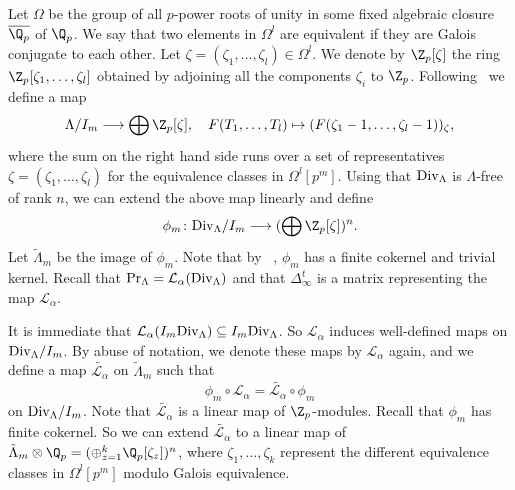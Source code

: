 Let $\Omega$ be the group of all $p$-power roots of unity in some fixed algebraic closure $\overline{\Q_p}$ of $\Q_p$. We say that two elements in $\Omega^l$ are equivalent if they are Galois conjugate to each other.  Let $\zeta=(\zeta_1,\dots,\zeta_l)\in \Omega^l$. We denote by $\Z_p[\zeta]$ the ring $\Z_p[\zeta_1,\dots,\zeta_l]$ obtained by adjoining all the components $\zeta_i$ to $\Z_p$. Following~\cite{cuoco-monsky} we define a map
\[\Lambda/I_m\longrightarrow \bigoplus \Z_p[\zeta], \quad F(T_1,\dots,T_l)\mapsto (F(\zeta_1-1,\dots, \zeta_l-1))_\zeta, \]
where the sum on the right hand side runs over a set of representatives ${\zeta = (\zeta_1, \ldots, \zeta_l)}$ for the equivalence classes in $\Omega^l[p^m]$. 
Using that $\textup{Div}_\Lambda$ is $\Lambda$-free of rank $n$, we can extend the above map linearly and define 
\[\phi_m\colon \textup{Div}_\Lambda/I_m\longrightarrow (\bigoplus \Z_p[\zeta])^n. \] 
Let $\tilde{\Lambda}_m$ be the image of $\phi_m$. Note that by ~\cite[Theorem~2.2]{cuoco-monsky}, $\phi_m$ has a finite cokernel and trivial kernel. Recall that $\textup{Pr}_\Lambda=\mathcal{L}_\alpha(\textup{Div}_\Lambda)$ and that $\Delta^t_\infty$ is a matrix representing the map $\mathcal{L}_\alpha$. 

It is immediate that $\mathcal{L}_\alpha(I_m\textup{Div}_\Lambda)\subseteq I_m\textup{Div}_\Lambda$. So $\mathcal{L}_\alpha$ induces well-defined maps on $\textup{Div}_\Lambda/I_m$. By abuse of notation, we denote these maps by $\mathcal{L}_\alpha$ again, and we define a map $\tilde{\mathcal{L}_\alpha}$ on $\tilde{\Lambda}_m$ such that
\[\phi_m\circ \mathcal{L}_\alpha=\tilde{\mathcal{L}_\alpha}\circ \phi_m\] 
on $\textup{Div}_\Lambda/I_m$. 
Note that $\tilde{\mathcal{L}_\alpha}$ is a linear map of $\Z_p$-modules. 
Recall that $\phi_m$ has finite cokernel. So we can extend $\tilde{\mathcal{L}_\alpha}$ to a linear map of $\tilde{\Lambda}_m\otimes \Q_p=(\oplus_{z=1}^k\Q_p[\zeta_z])^n$, where $\zeta_1, \ldots, \zeta_k$ represent the different equivalence classes in $\Omega^l[p^m]$ modulo Galois equivalence.

